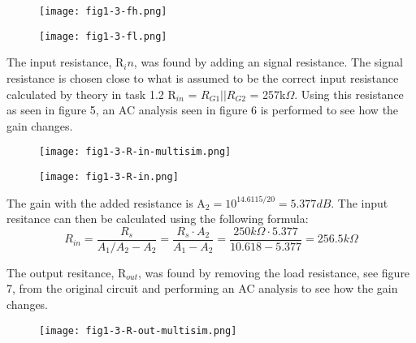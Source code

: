  \begin{figure}[h!]
        \centering
        \texttt{[image: fig1-3-fh.png]}
  \end{figure}

  \begin{figure}[h!]
        \centering
        \texttt{[image: fig1-3-fl.png]}
  \end{figure}

  \pagebreak

  The input resistance, R$_in$, was found by adding an signal resistance. The signal resistance is chosen close to what is assumed to be the correct input resistance calculated by theory in task 1.2 R$_{in}$ = $R_{G1}||R_{G2}$ = 257k$\Omega$. Using this resistance as seen in figure 5, an AC analysis seen in figure 6 is performed to see how the gain changes.\\
  
  \begin{figure}[h!]
        \centering
        \texttt{[image: fig1-3-R-in-multisim.png]}
  \end{figure}

  \begin{figure}[h!]
        \centering
        \texttt{[image: fig1-3-R-in.png]}
  \end{figure}

The gain with the added resistance is A$_2 = 10^{14.6115/20} = 5.377 dB$. The input resitance can then be calculated using the following formula:$$R_{in} = \frac{R_s}{A_1 / A_2 - A_2} = \frac{R_s \cdot A_2}{A_1 - A_2} = \frac{250k\Omega \cdot 5.377}{10.618 - 5.377} = 256.5 k\Omega$$

\pagebreak

The output resitance, R$_{out}$, was found by removing the load resistance, see figure 7, from the original circuit and performing an AC analysis to see how the gain changes.\\

\begin{figure}[h!]
        \centering
        \texttt{[image: fig1-3-R-out-multisim.png]}
  \end{figure}

